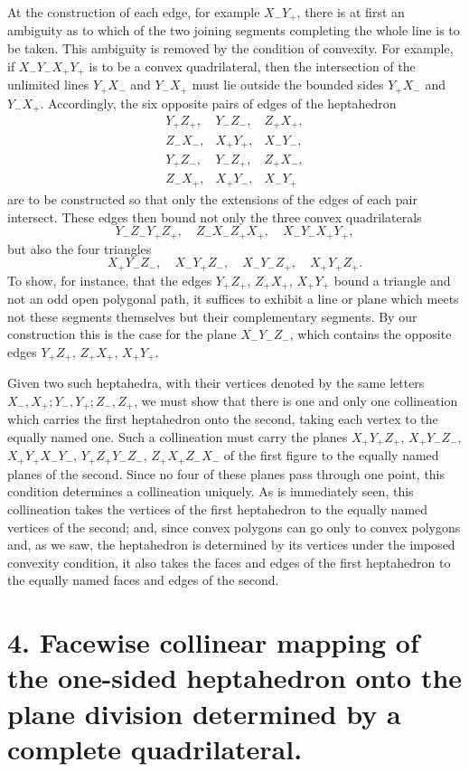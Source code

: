 \documentclass[11pt,a4paper]{article}
\begin{document}
At the construction of each edge, for example $X_-Y_+$, there is at first an ambiguity as to which of the two joining segments completing the whole line is to be taken. This ambiguity is removed by the condition of convexity. For example, if $X_-Y_-X_+Y_+$ is to be a convex quadrilateral, then the intersection of the unlimited lines $Y_+X_-$ and $Y_-X_+$ must lie outside the bounded sides $Y_+X_-$ and $Y_-X_+$. Accordingly, the six opposite pairs of edges of the heptahedron
\[
\begin{array}{lll}
Y_+Z_+,&Y_-Z_-,&Z_+X_+,\\
Z_-X_-,&X_+Y_+,&X_-Y_-,\\
Y_+Z_-,&Y_-Z_+,&Z_+X_-,\\
Z_-X_+,&X_+Y_-,&X_-Y_+
\end{array}
\]
are to be constructed so that only the extensions of the edges of each pair intersect. These edges then bound not only the three convex quadrilaterals
\[
 Y_-Z_-Y_+Z_+,
 \quad Z_-X_-Z_+X_+,
 \quad X_-Y_-X_+Y_+,
\]
but also the four triangles
\[
 X_+Y_-Z_-,
 \quad X_-Y_+Z_-,
 \quad X_-Y_-Z_+,
 \quad X_+Y_+Z_+.
\]
To show, for instance, that the edges $Y_+Z_+$, $Z_+X_+$, $X_+Y_+$ bound a triangle and not an odd open polygonal path, it suffices to exhibit a line or plane which meets not these segments themselves but their complementary segments. By our construction this is the case for the plane $X_-Y_-Z_-$, which contains the opposite edges $Y_+Z_+$, $Z_+X_+$, $X_+Y_+$.

Given two such heptahedra, with their vertices denoted by the same letters $X_-,X_+;Y_-,Y_+;Z_-,Z_+$, we must show that there is one and only one collineation which carries the first heptahedron onto the second, taking each vertex to the equally named one. Such a collineation must carry the planes $X_+Y_+Z_+$, $X_+Y_-Z_-$, $X_+Y_+X_-Y_-$, $Y_+Z_+Y_-Z_-$, $Z_+X_+Z_-X_-$ of the first figure to the equally named planes of the second. Since no four of these planes pass through one point, this condition determines a collineation uniquely. As is immediately seen, this collineation takes the vertices of the first heptahedron to the equally named vertices of the second; and, since convex polygons can go only to convex polygons and, as we saw, the heptahedron is determined by its vertices under the imposed convexity condition, it also takes the faces and edges of the first heptahedron to the equally named faces and edges of the second.

\section*{4. Facewise collinear mapping of the one-sided heptahedron onto the plane division determined by a complete quadrilateral.}
\end{document}
